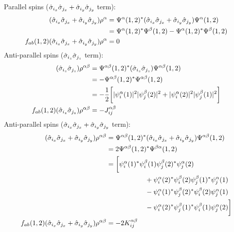 Parallel spins ($\hat{\sigma}_{i_x}\hat{\sigma}_{j_x} + \hat{\sigma}_{i_y}\hat{\sigma}_{j_y}$ term):
\begin{align}
    (\hat{\sigma}_{i_x}\hat{\sigma}_{j_x} + \hat{\sigma}_{i_y}\hat{\sigma}_{j_y})\rho^{\alpha} &= \Psi^\alpha(1,2)^*(\hat{\sigma}_{i_x}\hat{\sigma}_{j_x} + \hat{\sigma}_{i_y}\hat{\sigma}_{j_y})\Psi^\alpha(1,2) \label{zfs:eq:36} \\
    &= \Psi^\alpha(1,2)^*\Psi^\beta(1,2) - \Psi^\alpha(1,2)^*\Psi^\beta(1,2) \label{zfs:eq:37} \\
    f_{ab}(1,2)(\hat{\sigma}_{i_x}\hat{\sigma}_{j_x} + \hat{\sigma}_{i_y}\hat{\sigma}_{j_y})\rho^{\alpha}&= 0
    \label{zfs:eq:38}
\end{align}
Anti-parallel spins ($\hat{\sigma}_{i_z}\hat{\sigma}_{j_z}$ term):
\begin{align}
    (\hat{\sigma}_{i_z}\hat{\sigma}_{j_z})\rho^{\alpha\beta} &= \Psi^{\alpha\beta}(1,2)^*(\hat{\sigma}_{i_z}\hat{\sigma}_{j_z})\Psi^{\alpha\beta}(1,2) \label{zfs:eq:39} \\
    &= - \Psi^{\alpha\beta}(1,2)^*\Psi^{\alpha\beta}(1,2) \label{zfs:eq:40} \\
    &= - \frac{1}{2} \bigg[
    |\psi_i^\alpha(1)|^2|\psi_j^\beta(2)|^2
    + |\psi_i^\alpha(2)|^2|\psi_j^\beta(1)|^2
    \bigg] \label{zfs:eq:41} \\
    f_{ab}(1,2)(\hat{\sigma}_{i_z}\hat{\sigma}_{j_z})\rho^{\alpha\beta}&= - J_{ij}^{\alpha\beta}  \label{zfs:eq:42}
\end{align}
Anti-parallel spins ($\hat{\sigma}_{i_x}\hat{\sigma}_{j_x} + \hat{\sigma}_{i_y}\hat{\sigma}_{j_y}$ term):
\begin{align}
    (\hat{\sigma}_{i_x}\hat{\sigma}_{j_x} + \hat{\sigma}_{i_y}\hat{\sigma}_{j_y})\rho^{\alpha\beta} &= \Psi^{\alpha\beta}(1,2)^*(\hat{\sigma}_{i_x}\hat{\sigma}_{j_x} + \hat{\sigma}_{i_y}\hat{\sigma}_{j_y})\Psi^{\alpha\beta}(1,2)  \label{zfs:eq:43} \\
    &= 2\Psi^{\alpha\beta}(1,2)^*\Psi^{\beta\alpha}(1,2)  \label{zfs:eq:44} \\
    &= \bigg[
    \psi_i^\alpha(1)^*\psi_i^\beta(1)\psi_j^\beta(2)^*\psi_j^\alpha(2)  \label{zfs:eq:45} \\
    &\hspace{2cm} + \psi_i^\alpha(2)^*\psi_i^\beta(2)\psi_j^\beta(1)^*\psi_j^\alpha(1) \notag \\
    &\hspace{2cm} - \psi_i^\alpha(1)^*\psi_j^\beta(2)^*\psi_i^\beta(2)\psi_j^\alpha(1) \notag \\
    &\hspace{2cm} - \psi_i^\alpha(2)^*\psi_j^\beta(1)^*\psi_i^\beta(1)\psi_j^\alpha(2) \bigg]  \notag \\
    f_{ab}(1,2)(\hat{\sigma}_{i_x}\hat{\sigma}_{j_x} + \hat{\sigma}_{i_y}\hat{\sigma}_{j_y})\rho^{\alpha\beta}&= - 2K_{ij}^{\alpha\beta}
    \label{zfs:eq:46}
\end{align}
